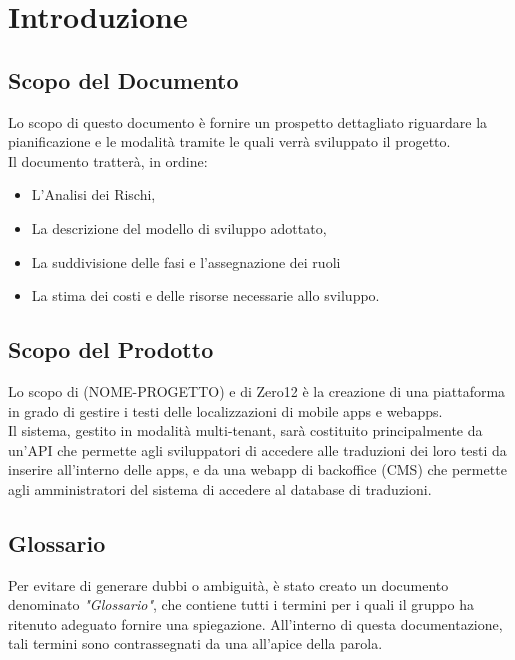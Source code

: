 \documentclass[12pt, a4paper]{article}
\begin{document}
    \tableofcontents
    \listoffigures
    \listoftables
    \newpage

    \section{Introduzione}
    \subsection{Scopo del Documento}
    Lo scopo di questo documento è fornire un prospetto dettagliato riguardare la pianificazione e le modalità tramite le quali verrà sviluppato il progetto.\\
    Il documento tratterà, in ordine:
    \begin{itemize}
        \item L'Analisi dei Rischi,
        \item La descrizione del modello di sviluppo adottato,
        \item La suddivisione delle fasi e l'assegnazione dei ruoli
        \item La stima dei costi e delle risorse necessarie allo sviluppo.
    \end{itemize}

    \subsection{Scopo del Prodotto}
    Lo scopo di (NOME-PROGETTO) e di Zero12 è la creazione di una piattaforma in grado di gestire i testi delle localizzazioni di mobile apps e webapps. \\
    Il sistema, gestito in modalità multi-tenant, sarà costituito principalmente da un'API che permette agli sviluppatori di accedere alle traduzioni dei loro 
    testi da inserire all'interno delle apps, e da una webapp di backoffice (CMS) che permette agli amministratori del sistema di accedere al database di traduzioni.

    \subsection{Glossario}
    Per evitare di generare dubbi o ambiguità, è stato creato un documento denominato \emph{"Glossario"}, che contiene tutti i termini per i quali il gruppo ha ritenuto
    adeguato fornire una spiegazione. All'interno di questa documentazione, tali termini sono contrassegnati da una  all'apice della parola.
\end{document}

